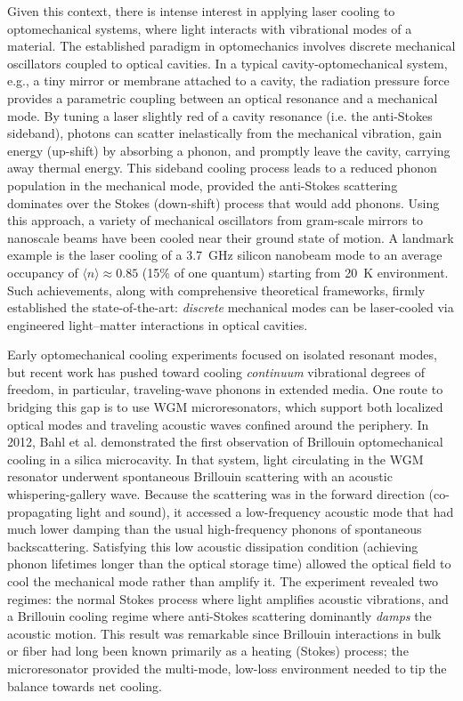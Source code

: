 Given this context, there is intense interest in applying laser cooling to optomechanical systems, where light interacts with vibrational modes of a material. The established paradigm in optomechanics involves discrete mechanical oscillators coupled to optical cavities. \cite{aspelmeyer2014cavity} In a typical cavity-optomechanical system, e.g., a tiny mirror or membrane attached to a cavity, the radiation pressure force provides a parametric coupling between an optical resonance and a mechanical mode. \cite{aspelmeyer2014cavity} By tuning a laser slightly red of a cavity resonance (i.e. the anti-Stokes sideband), photons can scatter inelastically from the mechanical vibration, gain energy (up-shift) by absorbing a phonon, and promptly leave the cavity, carrying away thermal energy. This sideband cooling process leads to a reduced phonon population in the mechanical mode, provided the anti-Stokes scattering dominates over the Stokes (down-shift) process that would add phonons. Using this approach, a variety of mechanical oscillators from gram-scale mirrors to nanoscale beams have been cooled near their ground state of motion. \cite{chan2011laser} A landmark example is the laser cooling of a \SI{3.7}{\giga\hertz} silicon nanobeam mode to an average occupancy of \(\langle n\rangle \approx 0.85\) (15\% of one quantum) starting from \SI{20}{\kelvin} environment. \cite{chan2011laser} Such achievements, along with comprehensive theoretical frameworks\cite{aspelmeyer2014cavity}, firmly established the state-of-the-art: \emph{discrete} mechanical modes can be laser-cooled via engineered light–matter interactions in optical cavities.

Early optomechanical cooling experiments focused on isolated resonant modes, but recent work has pushed toward cooling \emph{continuum} vibrational degrees of freedom, in particular, traveling-wave phonons in extended media. One route to bridging this gap is to use \ac{WGM} microresonators, which support both localized optical modes and traveling acoustic waves confined around the periphery. In 2012, Bahl et al. demonstrated the first observation of Brillouin optomechanical cooling in a silica microcavity. \cite{bahl2012observation} In that system, light circulating in the \ac{WGM} resonator underwent spontaneous Brillouin scattering with an acoustic whispering-gallery wave. Because the scattering was in the forward direction (co-propagating light and sound), it accessed a low-frequency acoustic mode that had much lower damping than the usual high-frequency phonons of spontaneous backscattering. Satisfying this low acoustic dissipation condition (achieving phonon lifetimes longer than the optical storage time) allowed the optical field to cool the mechanical mode rather than amplify it. The experiment revealed two regimes: the normal Stokes process where light amplifies acoustic vibrations, and a Brillouin cooling regime where anti-Stokes scattering dominantly \emph{damps} the acoustic motion. This result was remarkable since Brillouin interactions in bulk or fiber had long been known primarily as a heating (Stokes) process; the microresonator provided the multi-mode, low-loss environment needed to tip the balance towards net cooling.

